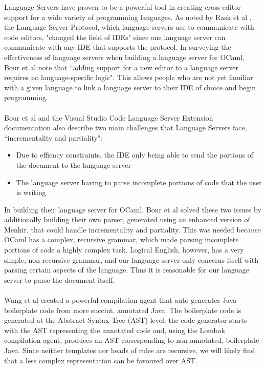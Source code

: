 \documentclass[../main.tex]{subfiles}
\begin{document}
Language Servers have proven to be a powerful tool in creating cross-editor support for a wide variety of programming languages. As noted by Rask et al \cite[]{standardised_lsp_extensions}, the Language Server Protocol, which language servers use to communicate with code editors, "changed the field of IDEs" since one language server can communicate with any IDE that supports the protocol. In surveying the effectiveness of language servers when building a language server for OCaml, Bour et al \cite[]{merlin_experience_report} note that ``adding support for a new editor to a language server requires no language-specific logic". This allows people who are not yet familiar with a given language to link a language server to their IDE of choice and begin programming. 
\\ \\
Bour et al \cite[]{merlin_experience_report} and the Visual Studio Code Language Server Extension documentation \cite[]{vsc_langserver_docs} also describe two main challenges that Language Servers face, ``incrementality and partiality":
\begin{itemize}
    \item Due to effiency constraints, the IDE only being able to send the portions of the document to the language server
    \item The language server having to parse incomplete portions of code that the user is writing
\end{itemize}
In building their language server for OCaml, Bour et al solved these two issues by additionally building their own parser, generated using an enhanced version of Menhir, that could handle incrementality and partiality. This was needed because OCaml has a complex, recursive grammar, which made parsing incomplete portions of code a highly complex task. Logical English, however, has a very simple, non-recursive grammar, and our language server only concerns itself with parsing certain aspects of the language. Thus it is reasonable for our language server to parse the document itself.
\\ \\
Wang et al \cite[]{classless_java} created a powerful compilation agent that auto-generates Java boilerplate code from more succint, annotated Java. The boilerplate code is generated at the Abstract Syntax Tree (AST) level: the code generator starts with the AST representing the annotated code and, using the Lombok compilation agent, produces an AST corresponding to non-annotated, boilerplate Java. Since neither templates nor heads of rules are recursive, we will likely find that a less complex representation can be favoured over AST.
\end{document}
